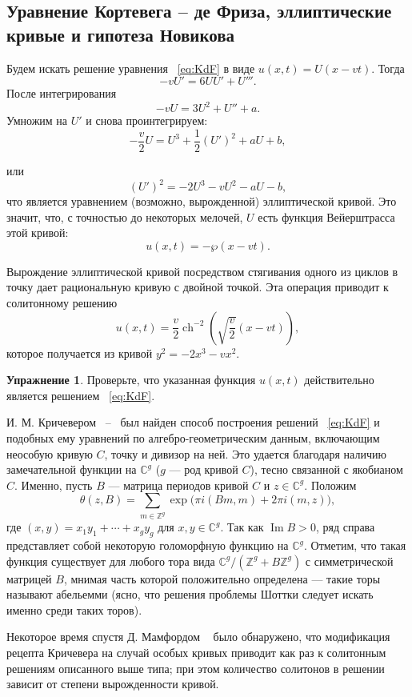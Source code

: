 \documentclass{article}
\theoremstyle{definition}
\theoremstyle{definition} %
\theoremstyle{remark}     %
\theoremstyle{definition}
\theoremstyle{definition}
\theoremstyle{definition}
\theoremstyle{definition}
\theoremstyle{definition}
\theoremstyle{definition}
\theoremstyle{definition}
\theoremstyle{definition}
\newtheorem{exercise}{Упражнение}[section]
\begin{document}
\subsection{Уравнение Кортевега -- де Фриза, эллиптические кривые и гипотеза Новикова}
Будем искать решение уравнения ~\ref{eq:KdF} в виде \(u(x, t) = U(x - vt)\). Тогда
\[
-vU' = 6UU' + U'''.
\]
После интегрирования
\[
-vU = 3U^2 + U'' + a.
\]
Умножим на \(U'\) и снова проинтегрируем:
\[
-\frac{v}{2}U = U^3 + \frac{1}{2}(U')^2 + aU + b,
\]


или
\[
(U')^2 = -2U^3 - vU^2 - aU - b,
\]
что является уравнением (возможно, вырожденной) эллиптической кривой. Это значит, что, с точностью до некоторых мелочей, \(U\) есть функция Вейерштрасса этой кривой:
\[
u(x, t) = -\wp(x - vt).
\]

Вырождение эллиптической кривой посредством стягивания одного из циклов в точку дает рациональную кривую с двойной точкой. Эта операция приводит к солитонному решению
\[
u(x, t) = \frac{v}{2} \operatorname{ch}^{-2} \left(\sqrt{\frac{v}{2}} (x - vt)\right),
\]
которое получается из кривой \(y^2 = -2x^3 - vx^2\).

\begin{exercise} Проверьте, что указанная функция \(u(x, t)\) действительно является решением ~\ref{eq:KdF}.
\end{exercise}
И. М. Кричевером ~\cite{krichever1}--~\cite{krichever5} был найден способ построения решений ~\ref{eq:KdF} и подобных ему уравнений по алгебро-геометрическим данным, включающим неособую кривую \(C\), точку и дивизор на ней. Это удается благодаря наличию замечательной функции на \(\mathbb{C}^g\) (\(g\) --- род кривой \(C\)), тесно связанной с якобианом \(C\). Именно, пусть \(B\) --- матрица периодов кривой \(C\) и \(z \in \mathbb{C}^g\). Положим
\[
\theta(z, B) = \sum_{m \in \mathbb{Z}^g} \exp\bigl(\pi i (Bm, m) + 2\pi i (m, z)\bigr),
\]
где \((x, y) = x_1y_1 + \cdots + x_gy_g\) для \(x, y \in \mathbb{C}^g\). Так как \(\operatorname{Im} B > 0\), ряд справа представляет собой некоторую голоморфную функцию на \(\mathbb{C}^g\). Отметим, что такая функция существует для любого тора вида \(\mathbb{C}^g/(\mathbb{Z}^g + B\mathbb{Z}^g)\) с симметрической матрицей \(B\), мнимая часть которой положительно определена --- такие торы называют абельемми (ясно, что решения проблемы Шоттки следует искать именно среди таких торов).


Некоторое время спустя Д. Мамфордом ~\cite{mumford1} было обнаружено, что модификация рецепта Кричевера на случай особых кривых приводит как раз к солитонным решениям описанного выше типа; при этом количество солитонов в решении зависит от степени вырожденности кривой.
\end{document}
